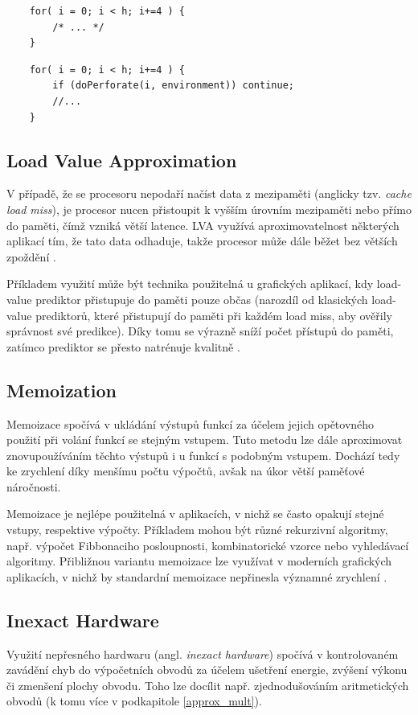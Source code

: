 \begin{verbatim}
    for( i = 0; i < h; i+=4 ) { 
        /* ... */ 
    }
\end{verbatim}

\begin{verbatim}
    for( i = 0; i < h; i+=4 ) {
        if (doPerforate(i, environment)) continue;
        //...
    }
\end{verbatim}

\subsection*{Load Value Approximation}
V případě, že se procesoru nepodaří načíst data z mezipaměti (anglicky tzv. \textit{cache load miss}), je procesor nucen přistoupit k vyšším úrovním mezipaměti nebo přímo do paměti, čímž vzniká větší latence. LVA využívá aproximovatelnost některých aplikací tím, že tato data odhaduje, takže procesor může dále běžet bez větších zpoždění \cite{ac_techniques}.

Příkladem využití může být technika použitelná u grafických aplikací, kdy load-value prediktor přistupuje do paměti pouze občas (narozdíl od klasických load-value prediktorů, které přistupují do paměti při každém load miss, aby ověřily správnost své predikce). Díky tomu se výrazně sníží počet přístupů do paměti, zatímco prediktor se přesto natrénuje kvalitně \cite{load_value_approx}.

\subsection*{Memoization}
Memoizace spočívá v ukládání výstupů funkcí za účelem jejich opětovného použití při volání funkcí se stejným vstupem. Tuto metodu lze dále aproximovat znovupoužíváním těchto výstupů i u funkcí s podobným vstupem. Dochází tedy ke zrychlení díky menšímu počtu výpočtů, avšak na úkor větší paměťové náročnosti.

Memoizace je nejlépe použitelná v aplikacích, v nichž se často opakují stejné vstupy, respektive výpočty. Příkladem mohou být různé rekurzivní algoritmy, např. výpočet Fibbonaciho posloupnosti, kombinatorické vzorce nebo vyhledávací algoritmy. Přibližnou variantu memoizace lze využívat v moderních grafických aplikacích, v nichž by standardní memoizace nepřinesla významné zrychlení \cite{ac_techniques}.

\subsection*{Inexact Hardware}
Využití nepřesného hardwaru (angl. \textit{inexact hardware}) spočívá v kontrolovaném zavádění chyb do výpočetních obvodů za účelem ušetření energie, zvýšení výkonu či zmenšení plochy obvodu. Toho lze docílit např. zjednodušováním aritmetických obvodů (k tomu více v podkapitole \ref{approx_mult}).

